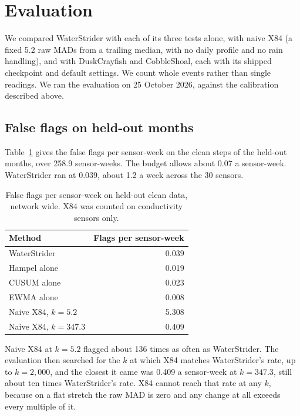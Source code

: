\documentclass{article}
\begin{document}
\section{Evaluation}
\label{sec:evaluation}

We compared WaterStrider with each of its three tests alone, with naive X84 (a
fixed 5.2 raw MADs from a trailing median, with no daily profile and no rain
handling), and with DuskCrayfish and CobbleShoal, each with its shipped
checkpoint and default settings. We count whole events rather than single readings. We ran the
evaluation on 25 October 2026, against the calibration described above.

\subsection{False flags on held-out months}
\label{sec:falseflags}

Table~\ref{tab:flags} gives the false flags per sensor-week on the clean steps
of the held-out months, over 258.9 sensor-weeks. The budget allows about 0.07
a sensor-week. WaterStrider ran at 0.039, about 1.2 a week across the 30
sensors.

\begin{table}[t]
  \centering
  \caption{False flags per sensor-week on held-out clean data, network wide.
    X84 was counted on conductivity sensors only.}
  \label{tab:flags}
  \begin{tabular}{lr}
    \toprule
    Method & Flags per sensor-week \\
    \midrule
    WaterStrider          & 0.039 \\
    Hampel alone          & 0.019 \\
    CUSUM alone           & 0.023 \\
    EWMA alone            & 0.008 \\
    Naive X84, $k = 5.2$   & 5.308 \\
    Naive X84, $k = 347.3$ & 0.409 \\
    \bottomrule
  \end{tabular}
\end{table}

Naive X84 at $k = 5.2$ flagged about 136 times as often as WaterStrider. The
evaluation then searched for the $k$ at which X84 matches WaterStrider's rate,
up to $k = 2{,}000$, and the closest it came was 0.409 a sensor-week at
$k = 347.3$, still about ten times WaterStrider's rate. X84 cannot reach that
rate at any $k$, because on a flat stretch the raw MAD is zero and any change
at all exceeds every multiple of it.
\end{document}
